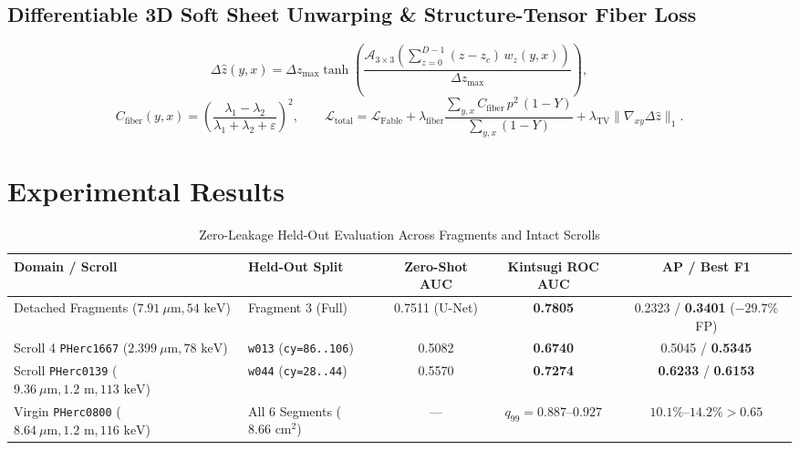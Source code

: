 \documentclass[11pt,a4paper]{article}
\begin{document}
\subsection{Differentiable 3D Soft Sheet Unwarping \& Structure-Tensor Fiber Loss}
\begin{equation}
\Delta\hat{z}(y,x) = \Delta z_{\max}\tanh\!\left(\frac{\mathcal{A}_{3\times 3}\!\left(\sum_{z=0}^{D-1}(z-z_c)\,w_z(y,x)\right)}{\Delta z_{\max}}\right),
\end{equation}
\begin{equation}
C_{\mathrm{fiber}}(y,x) = \left(\frac{\lambda_1 - \lambda_2}{\lambda_1 + \lambda_2 + \varepsilon}\right)^2, \qquad
\mathcal{L}_{\mathrm{total}} = \mathcal{L}_{\mathrm{Fable}} + \lambda_{\mathrm{fiber}}\frac{\sum_{y,x}C_{\mathrm{fiber}}\,p^2\,(1-Y)}{\sum_{y,x}(1-Y)} + \lambda_{\mathrm{TV}}\|\nabla_{xy}\Delta\hat{z}\|_1.
\end{equation}

\section{Experimental Results}
\begin{table}[h!]
\centering
\caption{Zero-Leakage Held-Out Evaluation Across Fragments and Intact Scrolls}
\begin{tabular}{llccc}
\toprule
\textbf{Domain / Scroll} & \textbf{Held-Out Split} & \textbf{Zero-Shot AUC} & \textbf{Kintsugi ROC AUC} & \textbf{AP / Best F1} \\
\midrule
Detached Fragments ($7.91\ \mu\text{m}, 54\text{ keV}$) & Fragment 3 (Full) & 0.7511 (U-Net) & \textbf{0.7805} & 0.2323 / \textbf{0.3401} ($-29.7\%$ FP) \\
Scroll 4 \texttt{PHerc1667} ($2.399\ \mu\text{m}, 78\text{ keV}$) & \texttt{w013} (\texttt{cy=86..106}) & 0.5082 & \textbf{0.6740} & 0.5045 / \textbf{0.5345} \\
Scroll \texttt{PHerc0139} ($9.36\ \mu\text{m}, 1.2\text{ m}, 113\text{ keV}$) & \texttt{w044} (\texttt{cy=28..44}) & 0.5570 & \textbf{0.7274} & \textbf{0.6233} / \textbf{0.6153} \\
Virgin \texttt{PHerc0800} ($8.64\ \mu\text{m}, 1.2\text{ m}, 116\text{ keV}$) & All 6 Segments ($8.66\text{ cm}^2$) & --- & $q_{99}=0.887\text{--}0.927$ & $10.1\%\text{--}14.2\% > 0.65$ \\
\bottomrule
\end{tabular}
\end{table}
\end{document}

